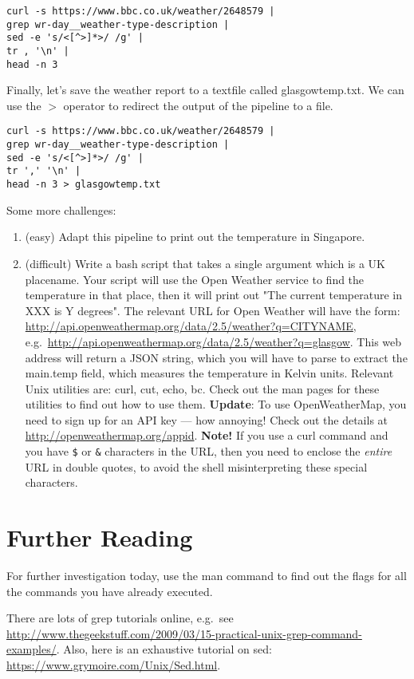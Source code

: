 \documentclass{article}
\begin{document}
\begin{verbatim}
curl -s https://www.bbc.co.uk/weather/2648579 | 
grep wr-day__weather-type-description |  
sed -e 's/<[^>]*>/ /g' | 
tr , '\n' | 
head -n 3
\end{verbatim}


Finally, let's save the weather report to a textfile called glasgowtemp.txt. We can use the $>$  operator to redirect the output of the pipeline to a file.

\begin{verbatim}
curl -s https://www.bbc.co.uk/weather/2648579 | 
grep wr-day__weather-type-description |  
sed -e 's/<[^>]*>/ /g' | 
tr ',' '\n' | 
head -n 3 > glasgowtemp.txt
\end{verbatim}

Some more challenges:
\begin{enumerate}
\item (easy) Adapt this pipeline to print out the temperature in Singapore.
\item (difficult) Write a bash script that takes a single argument which is a UK placename. Your script will use the Open Weather service to find the temperature in that place, then it will print out "The current temperature in XXX is Y degrees".
The relevant URL for Open Weather will have the form:
\url{http://api.openweathermap.org/data/2.5/weather?q=CITYNAME}, e.g.\
\url{http://api.openweathermap.org/data/2.5/weather?q=glasgow}.
This web address will return a JSON string, which you will have to parse to extract the main.temp field, which measures the temperature in Kelvin units.
Relevant Unix utilities are: \textsf{curl}, \textsf{cut}, \textsf{echo}, \textsf{bc}. Check out the man pages for these utilities to find out how to use them. \textbf{Update}: To use OpenWeatherMap, you need to sign up for an API key --- how annoying! Check out the details at \url{http://openweathermap.org/appid}. \textbf{Note!} If you use a curl command and you have \verb+$+ or \verb+&+ characters in the URL, then you need to enclose the \textit{entire} URL in double quotes, to avoid the shell misinterpreting these special characters.
\end{enumerate}

\section*{Further Reading}

For further investigation today, use the man command to find out 
the flags for all the commands you have already executed.

There are lots of grep tutorials online, e.g.\ see \url{http://www.thegeekstuff.com/2009/03/15-practical-unix-grep-command-examples/}.
Also, here is an exhaustive tutorial on sed: \url{https://www.grymoire.com/Unix/Sed.html}.
\end{document}
